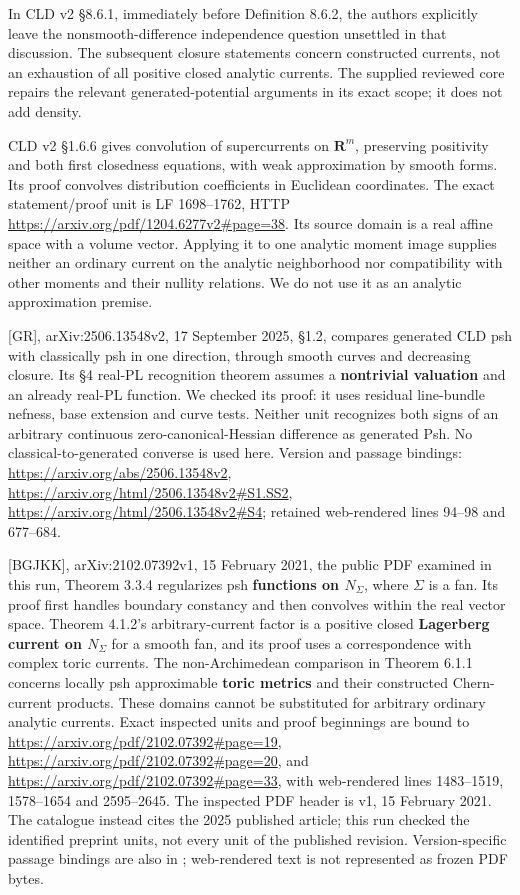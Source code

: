 \documentclass[
  11pt,
]{article}
\begin{document}
In CLD v2 §8.6.1, immediately before Definition 8.6.2, the authors
explicitly leave the nonsmooth-difference independence question
unsettled in that discussion. The subsequent closure statements concern
constructed currents, not an exhaustion of all positive closed analytic
currents. The supplied reviewed core repairs the relevant
generated-potential arguments in its exact scope; it does not add
density.

CLD v2 §1.6.6 gives convolution of supercurrents on \(\mathbf R^m\),
preserving positivity and both first closedness equations, with weak
approximation by smooth forms. Its proof convolves distribution
coefficients in Euclidean coordinates. The exact statement/proof unit is
LF 1698--1762, HTTP \url{https://arxiv.org/pdf/1204.6277v2\#page=38}.
Its source domain is a real affine space with a volume vector. Applying
it to one analytic moment image supplies neither an ordinary current on
the analytic neighborhood nor compatibility with other moments and their
nullity relations. We do not use it as an analytic approximation
premise.

{[}GR{]}, arXiv:2506.13548v2, 17 September 2025, §1.2, compares
generated CLD psh with classically psh in one direction, through smooth
curves and decreasing closure. Its §4 real-PL recognition theorem
assumes a \textbf{nontrivial valuation} and an already real-PL function.
We checked its proof: it uses residual line-bundle nefness, base
extension and curve tests. Neither unit recognizes both signs of an
arbitrary continuous zero-canonical-Hessian difference as generated Psh.
No classical-to-generated converse is used here. Version and passage
bindings: \url{https://arxiv.org/abs/2506.13548v2},
\url{https://arxiv.org/html/2506.13548v2\#S1.SS2},
\url{https://arxiv.org/html/2506.13548v2\#S4}; retained web-rendered
lines 94--98 and 677--684.

{[}BGJKK{]}, arXiv:2102.07392v1, 15 February 2021, the public PDF
examined in this run, Theorem 3.3.4 regularizes psh \textbf{functions on
\(N_\Sigma\)}, where \(\Sigma\) is a fan. Its proof first handles
boundary constancy and then convolves within the real vector space.
Theorem 4.1.2's arbitrary-current factor is a positive closed
\textbf{Lagerberg current on \(N_\Sigma\)} for a smooth fan, and its
proof uses a correspondence with complex toric currents. The
non-Archimedean comparison in Theorem 6.1.1 concerns locally psh
approximable \textbf{toric metrics} and their constructed Chern-current
products. These domains cannot be substituted for arbitrary ordinary
analytic currents. Exact inspected units and proof beginnings are bound
to \url{https://arxiv.org/pdf/2102.07392\#page=19},
\url{https://arxiv.org/pdf/2102.07392\#page=20}, and
\url{https://arxiv.org/pdf/2102.07392\#page=33}, with web-rendered lines
1483--1519, 1578--1654 and 2595--2645. The inspected PDF header is v1,
15 February 2021. The catalogue instead cites the 2025 published
article; this run checked the identified preprint units, not every unit
of the published revision. Version-specific passage bindings are also in
; web-rendered text is not represented as
frozen PDF bytes.
\end{document}
